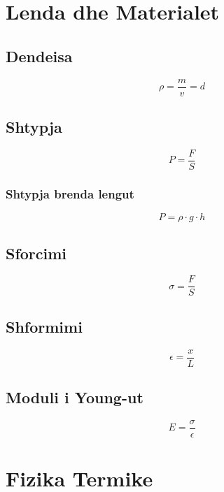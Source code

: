 \documentclass[a4paper, twocolumn]{article}
\begin{document}
\section{Lenda dhe Materialet}
\subsection{Dendeisa}
\[
\rho = \frac{m}{v}=d
\]
\subsection{Shtypja}
\[
P=\frac{F}{S}
\]
\subsubsection{Shtypja brenda lengut}
\[
P=\rho\cdot g\cdot h
\]
\subsection{Sforcimi}
\[
	\sigma=\frac{F}{S}
\]
\subsection{Shformimi}
\[
\epsilon=\frac{x}{L}
\]
\subsection{Moduli i Young-ut}
\[
E=\frac{\sigma}{\epsilon}
\]
\section{Fizika Termike}
\end{document}

